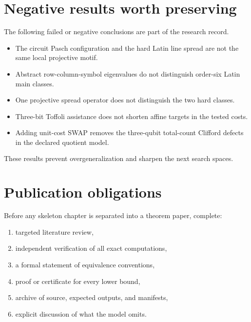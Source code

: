 \section{Negative results worth preserving}
The following failed or negative conclusions are part of the research record.
\begin{itemize}
\item The circuit Pasch configuration and the hard Latin line spread are not the same local projective motif.
\item Abstract row-column-symbol eigenvalues do not distinguish order-six Latin main classes.
\item One projective spread operator does not distinguish the two hard classes.
\item Three-bit Toffoli assistance does not shorten affine targets in the tested costs.
\item Adding unit-cost SWAP removes the three-qubit total-count Clifford defects in the declared quotient model.
\end{itemize}
These results prevent overgeneralization and sharpen the next search spaces.

\section{Publication obligations}
Before any skeleton chapter is separated into a theorem paper, complete:
\begin{enumerate}
\item targeted literature review,
\item independent verification of all exact computations,
\item a formal statement of equivalence conventions,
\item proof or certificate for every lower bound,
\item archive of source, expected outputs, and manifests,
\item explicit discussion of what the model omits.
\end{enumerate}
